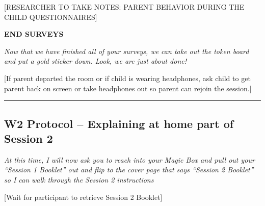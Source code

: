 \documentclass[
]{book}
\begin{document}
{[}RESEARCHER TO TAKE NOTES: PARENT BEHAVIOR DURING THE CHILD QUESTIONNAIRES{]}

\textbf{END SURVEYS}

\emph{Now that we have finished all of your surveys, we can take out the token board and put a gold sticker down. Look, we are just about done!}

{[}If parent departed the room or if child is wearing headphones, ask child to get parent back on screen or take headphones out so parent can rejoin the session.{]}

\begin{center}\rule{0.5\linewidth}{0.5pt}\end{center}

\hypertarget{w2-protocol-explaining-at-home-part-of-session-2}{%
\subsection{W2 Protocol -- Explaining at home part of Session 2}\label{w2-protocol-explaining-at-home-part-of-session-2}}

\emph{At this time, I will now ask you to reach into your Magic Box and pull out your ``Session 1 Booklet'' out and flip to the cover page that says ``Session 2 Booklet'' so I can walk through the Session 2 instructions}

{[}Wait for participant to retrieve Session 2 Booklet{]}
\end{document}
